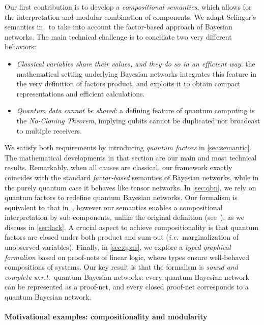 \documentclass[10pt,a4paper]{article}
\newcommand*{\ie}{\emph{i.e.}\xspace}
\newcommand*{\wrt}{\emph{w.r.t.}}
\begin{document}
Our first contribution is to develop a \emph{compositional semantics}, which allows for the interpretation and modular combination of components.
We adapt Selinger's semantics in~\cite{Selinger2004} to take into account the factor-based approach of Bayesian networks.
The main technical challenge is to conciliate two very different behaviors:
\begin{itemize}
\item
\emph{Classical variables share their values, and they do so in an efficient way}: the mathematical setting underlying Bayesian networks integrates this feature in the very definition of factors product, and exploits it to obtain compact representations and efficient calculations.
\item
\emph{Quantum data cannot be shared}: a defining feature of quantum computing is the \emph{No-Cloning Theorem}, implying qubits cannot be duplicated nor broadcast to multiple receivers.
\end{itemize}

We satisfy both requirements by introducing \emph{quantum factors} in \cref{sec:semantic}.
The mathematical developments in that section are our main and most technical results. 
Remarkably, when all causes are classical, our framework exactly coincides with the standard \emph{factor-based} semantics of Bayesian networks, while in the purely quantum case it behaves like tensor networks.
In \cref{sec:qbn}, we rely on quantum factors to redefine quantum Bayesian networks.
Our formalism is equivalent to that in~\cite{GBN2014}, however our semantics enables a compositional interpretation by sub-components, unlike the original definition (see~\cite[page 12]{GBN2014}), as we discuss in \cref{sec:lack}.
A crucial aspect to achieve compositionality is that quantum factors are closed under both product and sum-out (\ie\ marginalization of unobserved variables).
Finally, in \cref{sec:qpns}, we explore a \emph{typed graphical formalism} based on proof-nets of linear logic, where types ensure well-behaved compositions of systems.
Our key result is that the formalism is \emph{sound and complete} \wrt\ quantum Bayesian networks: every quantum Bayesian network can be represented as a proof-net, and every closed proof-net corresponds to a quantum Bayesian network.

\paragraph*{Motivational examples: compositionality and modularity}
\label{sec:motivational}
\end{document}
